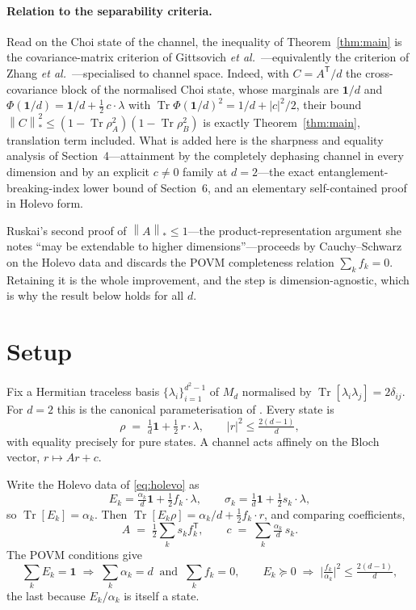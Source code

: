 \documentclass[11pt,a4paper]{article}
\theoremstyle{remark}
\DeclareMathOperator{\Tr}{Tr}
\newcommand{\I}{\mathbf{1}}
\newcommand{\nuc}[1]{\left\lVert #1 \right\rVert_{*}}
\begin{document}
\paragraph{Relation to the separability criteria.} Read on the Choi state of the channel, the inequality of Theorem~\ref{thm:main} is the covariance-matrix criterion of Gittsovich \emph{et al.}\ \cite[Prop.~IV.2]{Gittsovich2008}---equivalently the criterion of Zhang \emph{et al.}\ \cite[Thm.~1]{Zhang2008}---specialised to channel space. Indeed, with $C=A^{\mathsf T}/d$ the cross-covariance block of the normalised Choi state, whose marginals are $\I/d$ and $\Phi(\I/d)=\I/d+\tfrac12\,c\cdot\lambda$ with $\Tr\Phi(\I/d)^2=1/d+|c|^2/2$, their bound $\nuc{C}^2\le(1-\Tr\rho_A^2)(1-\Tr\rho_B^2)$ is exactly Theorem~\ref{thm:main}, translation term included. What is added here is the sharpness and equality analysis of Section~4---attainment by the completely dephasing channel in every dimension and by an explicit $c\neq0$ family at $d=2$---the exact entanglement-breaking-index lower bound of Section~6, and an elementary self-contained proof in Holevo form.

Ruskai's second proof of $\nuc{A}\le1$---the product-representation argument she notes ``may be extendable to higher dimensions''---proceeds by Cauchy--Schwarz on the Holevo data and discards the POVM completeness relation $\sum_k f_k=0$. Retaining it is the whole improvement, and the step is dimension-agnostic, which is why the result below holds for all $d$.

\section{Setup}

Fix a Hermitian traceless basis $\{\lambda_i\}_{i=1}^{d^2-1}$ of $M_d$ normalised by $\Tr[\lambda_i\lambda_j]=2\delta_{ij}$. For $d=2$ this is the canonical parameterisation of \cite{FA1999,RSW2002}. Every state is
\[
\rho \;=\; \tfrac1d\I + \tfrac12\,r\!\cdot\!\lambda, \qquad |r|^2 \le \tfrac{2(d-1)}{d},
\]
with equality precisely for pure states. A channel acts affinely on the Bloch vector, $r\mapsto Ar+c$.

Write the Holevo data of \eqref{eq:holevo} as
\[
E_k = \tfrac{\alpha_k}{d}\I + \tfrac12 f_k\!\cdot\!\lambda, \qquad
\sigma_k = \tfrac1d\I + \tfrac12 s_k\!\cdot\!\lambda ,
\]
so $\Tr[E_k]=\alpha_k$. Then $\Tr[E_k\rho] = \alpha_k/d + \tfrac12 f_k\!\cdot\!r$, and comparing coefficients,
\begin{equation}\label{eq:bloch}
A \;=\; \tfrac12\sum_k s_k f_k^{\mathsf T}, \qquad c \;=\; \sum_k \tfrac{\alpha_k}{d}\,s_k .
\end{equation}
The POVM conditions give
\begin{equation}\label{eq:povm}
\sum_k E_k=\I \;\Longrightarrow\; \sum_k\alpha_k=d \ \text{ and }\ \sum_k f_k=0,
\qquad
E_k\succeq0 \;\Longrightarrow\; \Big|\tfrac{f_k}{\alpha_k}\Big|^2 \le \tfrac{2(d-1)}{d},
\end{equation}
the last because $E_k/\alpha_k$ is itself a state.
\end{document}
